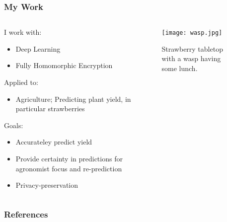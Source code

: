\documentclass[aspectratio=169]{beamer}
\begin{document}
  \begin{frame}
    \frametitle{My Work}
    \begin{columns}
      \begin{column}{0.5\textwidth}
        I work with:
        \begin{itemize}
          \item Deep Learning
          \item Fully Homomorphic Encryption
        \end{itemize}
        Applied to:
        \begin{itemize}
          \item Agriculture; Predicting plant yield, in particular strawberries
        \end{itemize}
        Goals:
        \begin{itemize}
          \item Accurateley predict yield
          \item Provide certainty in predictions for agronomist focus and re-prediction
          \item Privacy-preservation
        \end{itemize}
      \end{column}
      \begin{column}{0.5\textwidth}
        \begin{figure}[th!]
          \centering
          \texttt{[image: wasp.jpg]}
          \caption{Strawberry tabletop with a wasp having some lunch. \autocite{repository}}
          \label{fig:wasp}
        \end{figure}
      \end{column}
    \end{columns}
  \end{frame}

  \begin{frame}[allowframebreaks]
    \frametitle{References}
    \printbibliography
  \end{frame}
\end{document}
